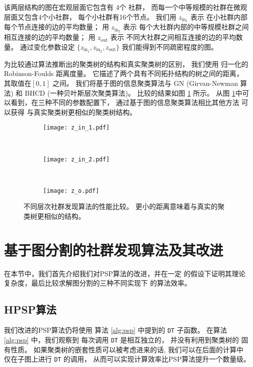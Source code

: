 该两层结构的图在宏观层面它包含有 4个 社群，
而每一个中等规模的社群在微观层面又包含4个小社群，
每个小社群有16个节点。
我们用 $z_{\mathrm{in}_1}$ 表示
在小社群内部每个节点连接的边的平均数量；
用 $z_{\mathrm{in}_2}$ 表示
每个大社群内部的中等规模社群之间相互连接的边的平均数量；
用 $z_{\mathrm{out}}$ 表示
不同大社群之间相互连接的边的平均数量。
通过变化参数设定 $\{z_{\mathrm{in}_1}, z_{\mathrm{in}_2}, z_{\mathrm{out}} \}$
我们能得到不同疏密程度的图。

为比较通过算法推断出的聚类树的结构和真实聚类树的区别，
我们使用 归一化的 Robinson-Foulds 距离度量。
它描述了两个具有不同拓扑结构的树之间的距离，
其取值在$[0,1]$ 之间。
我们将基于图的信息聚类算法与
GN (Girvan-Newman 算法) 和 BHCD (一种贝叶斯层次聚类算法\cite{RN23})。
比较的结果如图 \ref{fig:cdr} 所示。
从图 \ref{fig:cdr}中可以看到，在三种不同的参数配置下，
通过基于图的信息聚类算法相比其他方法 可以获得
与真实聚类树更相似的聚类树结构。

\begin{figure}
	\centering
	\begin{subfigure}{0.33\textwidth}
		\texttt{[image: z\_in\_1.pdf]}
		\caption{}
	\end{subfigure}~
	\begin{subfigure}{0.33\textwidth}
		\texttt{[image: z\_in\_2.pdf]}
		\caption{}
	\end{subfigure}~
	\begin{subfigure}{0.33\textwidth}
		\texttt{[image: z\_o.pdf]}
		\caption{}
	\end{subfigure}
	\caption{不同层次社群发现算法的性能比较。
  更小的距离意味着与真实的聚类树更相似的结构。
  }\label{fig:cdr}	
\end{figure}

\section{基于图分割的社群发现算法及其改进}
在本节中，我们首先介绍我们对PSP算法的改进，并在一定
的假设下证明其理论复杂度，最后比较求解图分割的三种不同实现下
的算法效率。
\subsection{HPSP算法}
我们改进的PSP算法仍将使用
算法 \ref{alg:psp} 中提到的
\texttt{DT} 子函数。
在算法\ref{alg:psp} 中，我们观察到
每次调用 \texttt{DT} 是相互独立的，
并没有利用到聚类树的 固有性质。
如果聚类树的嵌套性质可以被考虑进来的话, 
我们可以在后面的计算中
仅在子图上进行 \texttt{DT} 的调用，
从而可以实现计算效率比PSP算法提升一个数量级。


